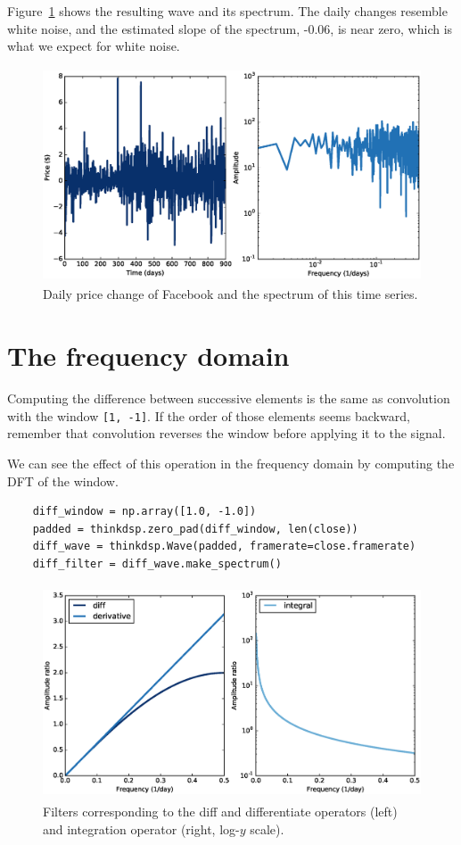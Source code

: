 \documentclass[12pt]{book}
\begin{document}
Figure~\ref{fig.diff_int2} shows the resulting wave and its spectrum.
The daily changes resemble white noise, and the estimated slope of the
spectrum, -0.06, is near zero, which is what we expect for white
noise.

\begin{figure}
\centerline{\includegraphics[height=2.5in]{figs/diff_int2.eps}}
\caption{Daily price change of Facebook and the spectrum of this time series.}
\label{fig.diff_int2}
\end{figure}


\section{The frequency domain}

Computing the difference
between successive elements is the same as convolution with
the window {\tt [1, -1]}.
If the order of those elements seems backward,
remember that convolution reverses the window before applying it
to the signal.

We can see the effect of this operation in the frequency domain
by computing the DFT of the window.  

\begin{verbatim}
    diff_window = np.array([1.0, -1.0])
    padded = thinkdsp.zero_pad(diff_window, len(close))
    diff_wave = thinkdsp.Wave(padded, framerate=close.framerate)
    diff_filter = diff_wave.make_spectrum()
\end{verbatim}

\begin{figure}
\centerline{\includegraphics[height=2.5in]{figs/diff_int3.eps}}
\caption{Filters corresponding to the diff and differentiate operators (left) and integration operator (right, log-$y$ scale).}
\label{fig.diff_int3}
\end{figure}
\end{document}
